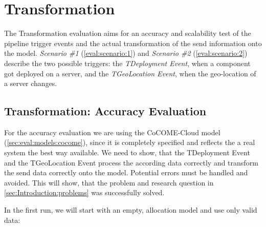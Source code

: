 \section{Transformation}
\label{sec:Evaluation:monitoring}

The Transformation evaluation aims for an accuracy and scalability test of the pipeline trigger events and the actual transformation of the send information onto the model. \textit{Scenario \#1} (\autoref{eval:scenario:1}) and \textit{Scenario \#2} (\autoref{eval:scenario:2}) describe the two possible triggers: the \textit{TDeployment Event}, when a component got deployed on a server, and the \textit{TGeoLocation Event}, when the geo-location of a server changes. 

\subsection{Transformation: Accuracy Evaluation}

For the accuracy evaluation we are using the CoCOME-Cloud model (\autoref{sec:eval:models:cocome}), since it is completely specified and reflects the a real system the best way available. We need to show, that the TDeployment Event and the TGeoLocation Event process the according data correctly and transform the send data correctly onto the model. Potential errors must be handled and avoided. This will show, that the problem and research question in \autoref{sec:Introduction:problems} was successfully solved.

In the first run, we will start with an empty, allocation model and use only valid data:

